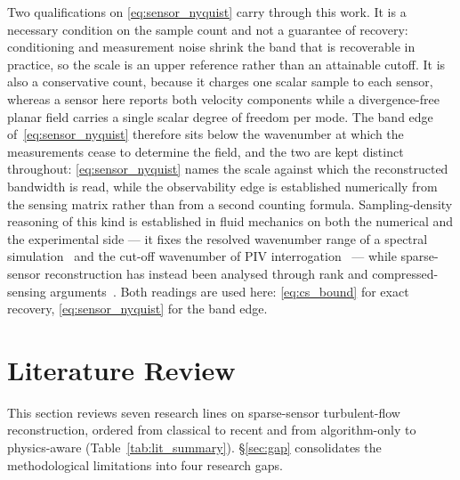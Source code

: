 Two qualifications on \eqref{eq:sensor_nyquist} carry through this work. It is a necessary condition on the sample count and not a guarantee of recovery: conditioning and measurement noise shrink the band that is recoverable in practice, so the scale is an upper reference rather than an attainable cutoff. It is also a conservative count, because it charges one scalar sample to each sensor, whereas a sensor here reports both velocity components while a divergence-free planar field carries a single scalar degree of freedom per mode. The band edge of~\eqref{eq:sensor_nyquist} therefore sits below the wavenumber at which the measurements cease to determine the field, and the two are kept distinct throughout: \eqref{eq:sensor_nyquist} names the scale against which the reconstructed bandwidth is read, while the observability edge is established numerically from the sensing matrix rather than from a second counting formula. Sampling-density reasoning of this kind is established in fluid mechanics on both the numerical and the experimental side --- it fixes the resolved wavenumber range of a spectral simulation~\cite{MoinMahesh1998} and the cut-off wavenumber of PIV interrogation~\cite{Foucaut2004} --- while sparse-sensor reconstruction has instead been analysed through rank and compressed-sensing arguments~\cite{Willcox2006, Bourguignon2014}. Both readings are used here: \eqref{eq:cs_bound} for exact recovery, \eqref{eq:sensor_nyquist} for the band edge.

\section{Literature Review}
\label{sec:literature}

This section reviews seven research lines on sparse-sensor turbulent-flow reconstruction, ordered from classical to recent and from algorithm-only to physics-aware (Table~\ref{tab:lit_summary}). \S\ref{sec:gap} consolidates the methodological limitations into four research gaps.

